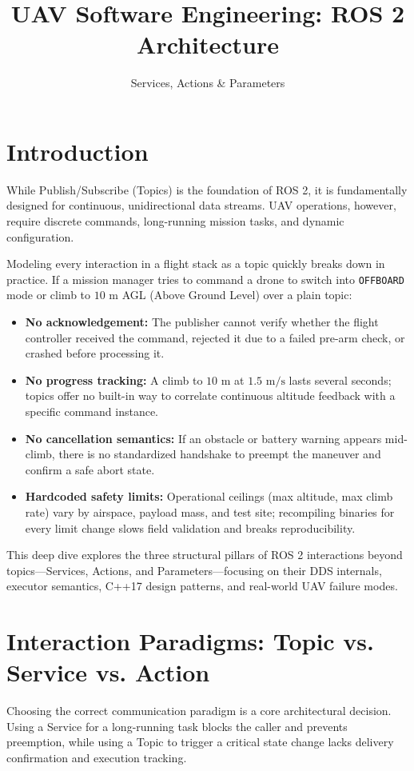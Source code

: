 \documentclass{article}
\title{UAV Software Engineering: ROS 2 Architecture}
\author{Services, Actions \& Parameters}
\date{}
\begin{document}
\maketitle

\section{Introduction}
While Publish/Subscribe (Topics) is the foundation of ROS 2, it is fundamentally designed for continuous, unidirectional data streams. UAV operations, however, require discrete commands, long-running mission tasks, and dynamic configuration. 

Modeling every interaction in a flight stack as a topic quickly breaks down in practice. If a mission manager tries to command a drone to switch into \texttt{OFFBOARD} mode or climb to $10\text{ m}$ AGL (Above Ground Level) over a plain topic:
\begin{itemize}
    \item \textbf{No acknowledgement:} The publisher cannot verify whether the flight controller received the command, rejected it due to a failed pre-arm check, or crashed before processing it.
    \item \textbf{No progress tracking:} A climb to $10\text{ m}$ at $1.5\text{ m/s}$ lasts several seconds; topics offer no built-in way to correlate continuous altitude feedback with a specific command instance.
    \item \textbf{No cancellation semantics:} If an obstacle or battery warning appears mid-climb, there is no standardized handshake to preempt the maneuver and confirm a safe abort state.
    \item \textbf{Hardcoded safety limits:} Operational ceilings (max altitude, max climb rate) vary by airspace, payload mass, and test site; recompiling binaries for every limit change slows field validation and breaks reproducibility.
\end{itemize}

This deep dive explores the three structural pillars of ROS 2 interactions beyond topics---Services, Actions, and Parameters---focusing on their DDS internals, executor semantics, C++17 design patterns, and real-world UAV failure modes.

\section{Interaction Paradigms: Topic vs. Service vs. Action}
Choosing the correct communication paradigm is a core architectural decision. Using a Service for a long-running task blocks the caller and prevents preemption, while using a Topic to trigger a critical state change lacks delivery confirmation and execution tracking.
\end{document}
